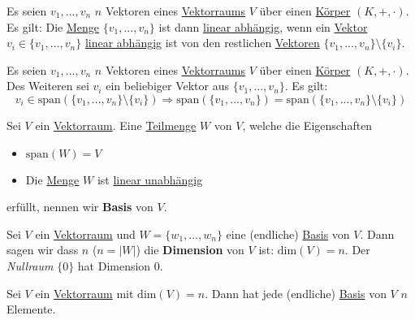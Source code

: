 \documentclass[../../main.tex]{subfiles}
\begin{document}
	\begin{theorem}
		Es seien $v_1,...,v_n$ $n$ Vektoren eines \hyperref[def:Vektorraum]{Vektorraums} $V$ über einen \hyperref[def:Körper]{Körper} $(K,+,\cdot)$. Es gilt: Die \hyperref[def:Menge]{Menge} $\{v_1,...,v_n\}$ ist dann \hyperref[def:LineareAbhängigkeitMenge]{linear abhängig}, wenn ein \hyperref[def:Vektor]{Vektor} $v_i \in\{v_1,...,v_n\}$ \hyperref[def:LineareAbhängigkeit]{linear abhängig} ist von den restlichen \hyperref[def:Vektor]{Vektoren} $\{v_1,...,v_n\}\setminus \{v_i\}$. 
	\end{theorem}

	\begin{theorem}
		Es seien $v_1,...,v_n$ $n$ Vektoren eines \hyperref[def:Vektorraum]{Vektorraums} $V$ über einen \hyperref[def:Körper]{Körper} $(K,+,\cdot)$. Des Weiteren sei $v_i$ ein beliebiger Vektor aus $\{v_1,...,v_n\}$. Es gilt: $$v_i \in \textrm{span}(\{v_1,...,v_n\}\setminus\{v_i\}) \Rightarrow \textrm{span}(\{v_1,...,v_n\}) = \textrm{span}(\{v_1,...,v_n\}\setminus\{v_i\})$$
	\end{theorem}

	\begin{definition}[Basis]
		\label{def:Basis}
		Sei $V$ ein \hyperref[def:Vektorraum]{Vektorraum}. Eine \hyperref[def:Teilmenge]{Teilmenge} $W$ von $V$, welche die Eigenschaften
		\begin{itemize}
			\item $\textrm{span}(W) = V$
			\item Die \hyperref[def:Menge]{Menge} $W$ ist \hyperref[def:LineareUnabhängigkeitMenge]{linear unabhängig}
		\end{itemize}
		erfüllt, nennen wir \textbf{Basis} von $V$. 
	\end{definition}

	\begin{definition}[Dimension]
		Sei $V$ ein \hyperref[def:Vektorraum]{Vektorraum} und $W = \{w_1,...,w_n\}$ eine (endliche) \hyperref[def:Basis]{Basis} von $V$. Dann sagen wir dass $n$ ($n=|W|$) die \textbf{Dimension} von $V$ ist: $\textrm{dim}(V)=n$. Der \textit{Nullraum} $\{0\}$ hat Dimension 0. 
	\end{definition}

	\begin{theorem}
		Sei $V$ ein \hyperref[def:Vektorraum]{Vektorraum} mit $\textrm{dim}(V)=n$. Dann hat jede (endliche) \hyperref[def:Basis]{Basis} von $V$ $n$ Elemente.
	\end{theorem}
\end{document}
